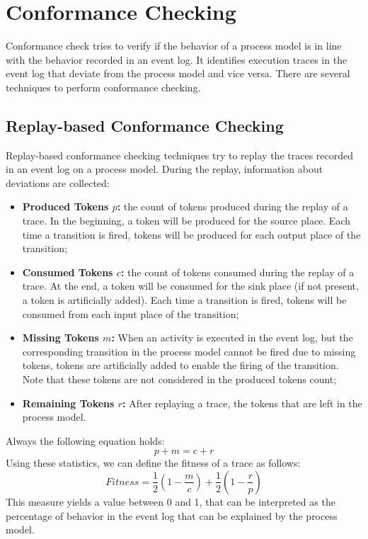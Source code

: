 \section{Conformance Checking}
Conformance check tries to verify if the behavior of a process model is in line with the behavior recorded in an event log.
It identifies execution traces in the event log that deviate from the process model and vice versa.
There are several techniques to perform conformance checking.

\subsection{Replay-based Conformance Checking}
Replay-based conformance checking techniques try to replay the traces recorded in an event log on a process model.
During the replay, information about deviations are collected:
\begin{itemize}
    \item \textbf{Produced Tokens $p$:} the count of tokens produced during the replay of a trace. In the beginning, a token will be produced for the source place.
    Each time a transition is fired, tokens will be produced for each output place of the transition;
    \item \textbf{Consumed Tokens $c$:} the count of tokens consumed during the replay of a trace. At the end, a token will be consumed for the sink place (if not present, a token is artificially added).
    Each time a transition is fired, tokens will be consumed from each input place of the transition;
    \item \textbf{Missing Tokens $m$:} When an activity is executed in the event log, but the corresponding transition in the process model cannot be fired due to missing tokens,
    tokens are artificially added to enable the firing of the transition. Note that these tokens are not considered in the produced tokens count;
    \item \textbf{Remaining Tokens $r$:} After replaying a trace, the tokens that are left in the process model.
\end{itemize}
Always the following equation holds:
\begin{equation}
    p + m = c + r
\end{equation}
Using these statistics, we can define the fitness of a trace as follows:
\begin{equation}
    \label{eq:fitness}
    Fitness = \frac{1}{2}(1 - \frac{m}{c}) + \frac{1}{2} (1 - \frac{r}{p})
\end{equation}
This measure yields a value between 0 and 1, that can be interpreted as the percentage of behavior in the event log that can be explained by the process model.
